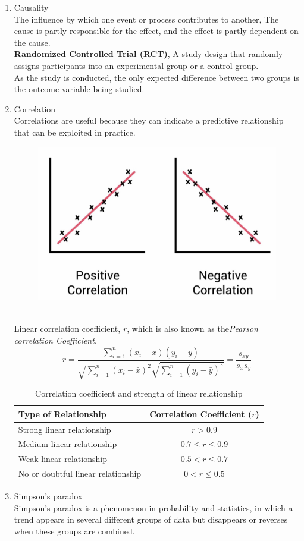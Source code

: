 \documentclass{article}
\begin{document}
\begin{enumerate}
    \item Causality \\ 
    The influence by which one event or process contributes to another, The cause is partly responsible for the effect, and the effect is partly dependent on the cause.\\
    \textbf{Randomized Controlled Trial (RCT)}, A study design that randomly assigns participants into an experimental group or a control group.\\
    As the study is conducted, the only expected difference between two groups is the outcome variable being studied.
    \item Correlation \\
    Correlations are useful because they can indicate a predictive relationship that can be exploited in practice.
    \begin{figure}[h]
        \centering
        \includegraphics[width=0.75\linewidth]{image/correlation.png}
    \end{figure} \\
    Linear correlation coefficient, $r$, which is also known as the\textit{Pearson correlation Coefficient}. 
    \[r = \frac{\sum_{i=1}^{n} (x_i - \bar{x})(y_i - \bar{y})}
    {\sqrt{\sum_{i=1}^{n} (x_i - \bar{x})^2} \sqrt{\sum_{i=1}^{n} (y_i - \bar{y})^2}}
    = \frac{s_{xy}}{s_x s_y}\]
    \begin{table}[h]
        \centering
        \begin{tabular}{lc}
        \hline
        \textbf{Type of Relationship} & \textbf{Correlation Coefficient (\( r \))} \\
        \hline
        Strong linear relationship & \( r > 0.9 \) \\
        Medium linear relationship & \( 0.7 \leq r \leq 0.9 \) \\
        Weak linear relationship & \( 0.5 < r \leq 0.7 \) \\
        No or doubtful linear relationship & \( 0 < r \leq 0.5 \) \\
        \hline
        \end{tabular}
        \caption{Correlation coefficient and strength of linear relationship}
    \end{table}
    \item Simpson's paradox \\
    Simpson's paradox is a phenomenon in probability and statistics, in which a trend appears in several different groups of data but disappears or reverses when these groups are combined.
\end{enumerate}
\end{document}
